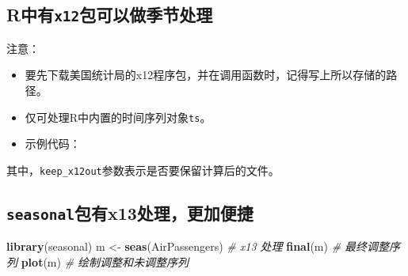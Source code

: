 \documentclass[
]{book}
\newenvironment{Shaded}{\begin{snugshade}}{\end{snugshade}}
\newcommand{\CharTok}[1]{\textcolor[rgb]{0.31,0.60,0.02}{#1}}
\newcommand{\CommentTok}[1]{\textcolor[rgb]{0.56,0.35,0.01}{\textit{#1}}}
\newcommand{\DataTypeTok}[1]{\textcolor[rgb]{0.13,0.29,0.53}{#1}}
\newcommand{\KeywordTok}[1]{\textcolor[rgb]{0.13,0.29,0.53}{\textbf{#1}}}
\newcommand{\NormalTok}[1]{#1}
\newcommand{\OperatorTok}[1]{\textcolor[rgb]{0.81,0.36,0.00}{\textbf{#1}}}
\newcommand{\OtherTok}[1]{\textcolor[rgb]{0.56,0.35,0.01}{#1}}
\newcommand{\StringTok}[1]{\textcolor[rgb]{0.31,0.60,0.02}{#1}}
\providecommand{\tightlist}{%
  \setlength{\itemsep}{0pt}\setlength{\parskip}{0pt}}
\begin{document}
\hypertarget{rux4e2dux6709x12ux5305ux53efux4ee5ux505aux5b63ux8282ux5904ux7406}{%
\subsection{\texorpdfstring{R中有\texttt{x12}包可以做季节处理}{R中有x12包可以做季节处理}}\label{rux4e2dux6709x12ux5305ux53efux4ee5ux505aux5b63ux8282ux5904ux7406}}

注意：

\begin{itemize}
\tightlist
\item
  要先下载美国统计局的x12程序包，并在调用函数时，记得写上所以存储的路径。
\item
  仅可处理R中内置的时间序列对象\texttt{ts}。
\item
  示例代码：
\end{itemize}

\begin{Shaded}
\end{Shaded}

其中，\texttt{keep\_x12out}参数表示是否要保留计算后的文件。

\hypertarget{seasonalux5305ux6709x13ux5904ux7406ux66f4ux52a0ux4fbfux6377}{%
\subsection{\texorpdfstring{\texttt{seasonal}包有x13处理，更加便捷}{seasonal包有x13处理，更加便捷}}\label{seasonalux5305ux6709x13ux5904ux7406ux66f4ux52a0ux4fbfux6377}}

\begin{Shaded}
\begin{Highlighting}[]
\KeywordTok{library}\NormalTok{(seasonal)}
\NormalTok{m <-}\StringTok{ }\KeywordTok{seas}\NormalTok{(AirPassengers) }\CommentTok{# x13 处理}
\KeywordTok{final}\NormalTok{(m) }\CommentTok{# 最终调整序列}
\KeywordTok{plot}\NormalTok{(m) }\CommentTok{# 绘制调整和未调整序列}
\end{Highlighting}
\end{Shaded}
\end{document}

